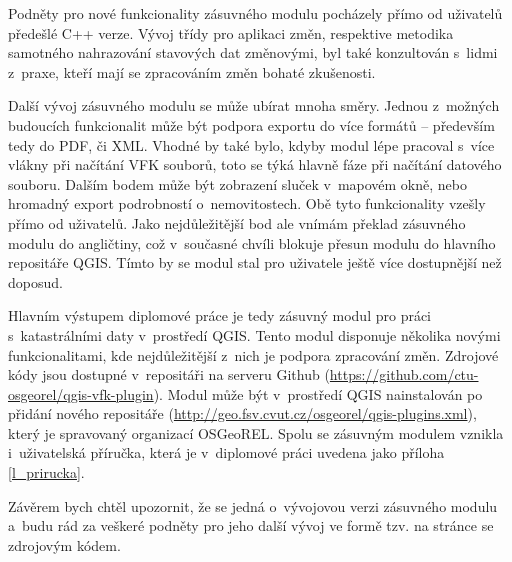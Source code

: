 \documentclass[a4paper,12pt,oneside]{book}
\begin{document}
Podněty pro nové funkcionality zásuvného modulu pocházely přímo od
uživatelů předešlé C++ verze. Vývoj třídy pro aplikaci změn,
respektive metodika samotného nahrazování stavových dat změnovými, byl
také konzultován s~lidmi z~praxe, kteří mají se zpracováním změn
bohaté zkušenosti.

Další vývoj zásuvného modulu se může ubírat mnoha směry. Jednou
z~možných budoucích funkcionalit může být podpora exportu do více
formátů -- především tedy do PDF, či XML. Vhodné by také bylo, kdyby
modul lépe pracoval s~více vlákny při načítání VFK souborů, toto se
týká hlavně fáze při načítání datového souboru. Dalším bodem může být
zobrazení sluček v~mapovém okně, nebo hromadný export podrobností
o~nemovitostech. Obě tyto funkcionality vzešly přímo od
uživatelů. Jako nejdůležitější bod ale vnímám překlad zásuvného modulu
do angličtiny, což v~současné chvíli blokuje přesun modulu do hlavního
repositáře QGIS. Tímto by se modul stal pro uživatele ještě více
dostupnější než doposud.

Hlavním výstupem diplomové práce je tedy zásuvný modul pro práci
s~katastrálními daty v~prostředí QGIS. Tento modul disponuje několika
novými funkcionalitami, kde nejdůležitější z~nich je podpora
zpracování změn. Zdrojové kódy jsou dostupné v~repositáři na serveru
Github (\url{https://github.com/ctu-osgeorel/qgis-vfk-plugin}). Modul
může být v~prostředí QGIS nainstalován po přidání nového repositáře
(\url{http://geo.fsv.cvut.cz/osgeorel/qgis-plugins.xml}), který je
spravovaný organizací OSGeoREL. Spolu se zásuvným modulem vznikla
i~uživatelská příručka, která je v~diplomové práci uvedena jako
příloha \ref{l_prirucka}.

Závěrem bych chtěl upozornit, že se jedná o~vývojovou verzi zásuvného
modulu a~budu rád za veškeré podněty pro jeho další vývoj ve formě
tzv.  na stránce se zdrojovým kódem.


\clearpage
\rhead{{\rightmark}}	%
\renewcommand{\refname}{Použitá literatura}



\clearpage
\listoffigures

\clearpage
\listoftables

\clearpage
\lstlistoflistings
\end{document}
